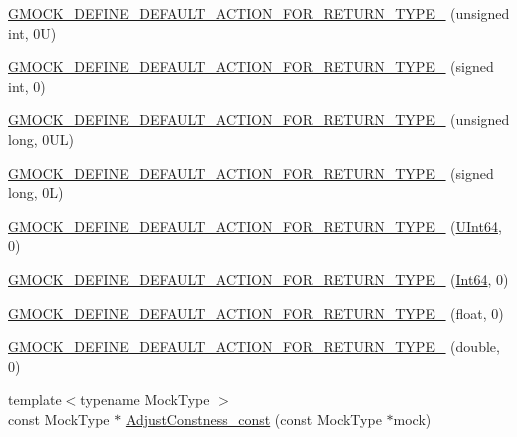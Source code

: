 \begin{DoxyCompactItemize}
\item 
\mbox{\hyperlink{namespacetesting_1_1internal_a4285332d8eae4bdfffc13b6c05252c30}{G\+M\+O\+C\+K\+\_\+\+D\+E\+F\+I\+N\+E\+\_\+\+D\+E\+F\+A\+U\+L\+T\+\_\+\+A\+C\+T\+I\+O\+N\+\_\+\+F\+O\+R\+\_\+\+R\+E\+T\+U\+R\+N\+\_\+\+T\+Y\+P\+E\+\_\+}} (unsigned int, 0\+U)
\item 
\mbox{\hyperlink{namespacetesting_1_1internal_a200a33af38e17df617883567c4fd96ab}{G\+M\+O\+C\+K\+\_\+\+D\+E\+F\+I\+N\+E\+\_\+\+D\+E\+F\+A\+U\+L\+T\+\_\+\+A\+C\+T\+I\+O\+N\+\_\+\+F\+O\+R\+\_\+\+R\+E\+T\+U\+R\+N\+\_\+\+T\+Y\+P\+E\+\_\+}} (signed int, 0)
\item 
\mbox{\hyperlink{namespacetesting_1_1internal_a1f4167b954a7ff0074ce8a5bb855f86f}{G\+M\+O\+C\+K\+\_\+\+D\+E\+F\+I\+N\+E\+\_\+\+D\+E\+F\+A\+U\+L\+T\+\_\+\+A\+C\+T\+I\+O\+N\+\_\+\+F\+O\+R\+\_\+\+R\+E\+T\+U\+R\+N\+\_\+\+T\+Y\+P\+E\+\_\+}} (unsigned long, 0\+U\+L)
\item 
\mbox{\hyperlink{namespacetesting_1_1internal_ad8804e25537427755c324ab03a72e776}{G\+M\+O\+C\+K\+\_\+\+D\+E\+F\+I\+N\+E\+\_\+\+D\+E\+F\+A\+U\+L\+T\+\_\+\+A\+C\+T\+I\+O\+N\+\_\+\+F\+O\+R\+\_\+\+R\+E\+T\+U\+R\+N\+\_\+\+T\+Y\+P\+E\+\_\+}} (signed long, 0\+L)
\item 
\mbox{\hyperlink{namespacetesting_1_1internal_ad2efcdbd12c7c020745b87bcc0997809}{G\+M\+O\+C\+K\+\_\+\+D\+E\+F\+I\+N\+E\+\_\+\+D\+E\+F\+A\+U\+L\+T\+\_\+\+A\+C\+T\+I\+O\+N\+\_\+\+F\+O\+R\+\_\+\+R\+E\+T\+U\+R\+N\+\_\+\+T\+Y\+P\+E\+\_\+}} (\mbox{\hyperlink{namespacetesting_1_1internal_ad24ae0a18ae0d3758b9a8333a0b56a4b}{U\+Int64}}, 0)
\item 
\mbox{\hyperlink{namespacetesting_1_1internal_ab427739121a380a7934bda96153f053d}{G\+M\+O\+C\+K\+\_\+\+D\+E\+F\+I\+N\+E\+\_\+\+D\+E\+F\+A\+U\+L\+T\+\_\+\+A\+C\+T\+I\+O\+N\+\_\+\+F\+O\+R\+\_\+\+R\+E\+T\+U\+R\+N\+\_\+\+T\+Y\+P\+E\+\_\+}} (\mbox{\hyperlink{namespacetesting_1_1internal_abd4adb4f2e2d7078a473de91a4089501}{Int64}}, 0)
\item 
\mbox{\hyperlink{namespacetesting_1_1internal_a71c697e5b567365fd3ff6c720769633b}{G\+M\+O\+C\+K\+\_\+\+D\+E\+F\+I\+N\+E\+\_\+\+D\+E\+F\+A\+U\+L\+T\+\_\+\+A\+C\+T\+I\+O\+N\+\_\+\+F\+O\+R\+\_\+\+R\+E\+T\+U\+R\+N\+\_\+\+T\+Y\+P\+E\+\_\+}} (float, 0)
\item 
\mbox{\hyperlink{namespacetesting_1_1internal_a7ba92aa33f4968c902623cd02e445020}{G\+M\+O\+C\+K\+\_\+\+D\+E\+F\+I\+N\+E\+\_\+\+D\+E\+F\+A\+U\+L\+T\+\_\+\+A\+C\+T\+I\+O\+N\+\_\+\+F\+O\+R\+\_\+\+R\+E\+T\+U\+R\+N\+\_\+\+T\+Y\+P\+E\+\_\+}} (double, 0)
\item 
{\footnotesize template$<$typename Mock\+Type $>$ }\\const Mock\+Type $\ast$ \mbox{\hyperlink{namespacetesting_1_1internal_a758f640e990a927dc148d6b960c0704b}{Adjust\+Constness\+\_\+const}} (const Mock\+Type $\ast$mock)

\end{DoxyCompactItemize}
